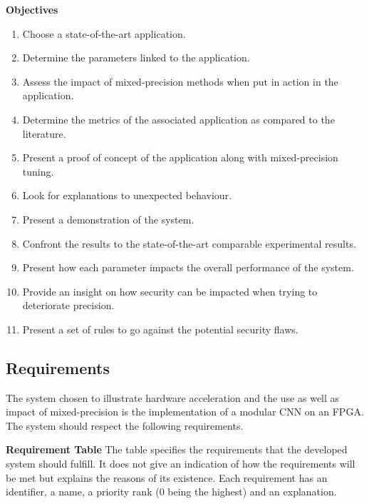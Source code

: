 \textbf{Objectives}

\begin{enumerate}
  \item Choose a state-of-the-art application.
  \item Determine the parameters linked to the application.
  \item Assess the impact of mixed-precision methods when put in action in the application.
  \item Determine the metrics of the associated application as compared to the literature.
  \item Present a proof of concept of the application along with mixed-precision tuning.
  \item Look for explanations to unexpected behaviour.
  \item Present a demonstration of the system.
  \item Confront the results to the state-of-the-art comparable experimental results.
  \item Present how each parameter impacts the overall performance of the system.
  \item Provide an insight on how security can be impacted when trying to deteriorate precision.
  \item Present a set of rules to go against the potential security flaws.
\end{enumerate}


\subsection{Requirements}

The system chosen to illustrate hardware acceleration and the use as well as impact of mixed-precision is the implementation of a modular CNN on an FPGA. The system should respect the following requirements.

\textbf{Requirement Table} The table specifies the requirements that the developed system should fulfill. It does not give an indication of how the requirements will be met but explains the reasons of its existence. Each requirement has an identifier, a name, a priority rank (0 being the highest) and an explanation.


